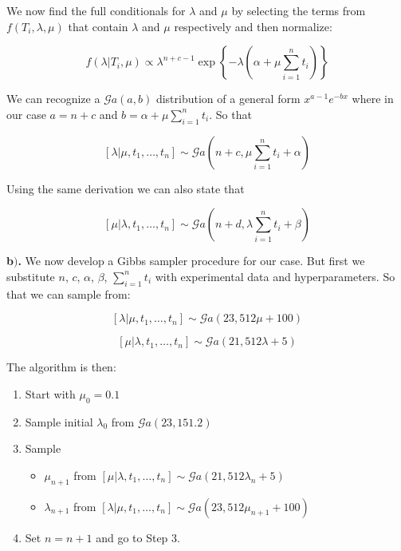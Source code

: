 \documentclass[a4 paper]{article}
\begin{document}
We now find the full conditionals for
$\lambda$ and $\mu$ by selecting the terms 
from $f(T_{i},\lambda,\mu)$ that contain
$\lambda$ and $\mu$ respectively and
then normalize:
 
$$
f(\lambda|T_{i},\mu)	\propto\lambda^{n+c-1}\exp\left\{ -\lambda\left(\alpha+\mu\sum_{i=1}^{n}t_{i}\right)\right\} 
$$

We can recognize a $\mathcal{G}a(a, b)$ 
distribution of a general form $x^{a-1}e^{-b x}$
where in our case $a=n+c$ and 
$b=\alpha+\mu\sum_{i=1}^{n}t_{i}$. So that

$$
\left[\lambda | \mu, t_{1}, \ldots, t_{n}\right] \sim \mathcal{G} a\left(n+c, \mu \sum_{i=1}^{n} t_{i}+\alpha\right)
$$

Using the same derivation we can also state that 

$$
\left[\mu | \lambda, t_{1}, \ldots, t_{n}\right] \sim \mathcal{G} a\left(n+d, \lambda \sum_{i=1}^{n} t_{i}+\beta\right)
$$






\textbf{b$)$.} We now develop a Gibbs sampler 
procedure for our case. But first we
substitute $n$, $c$, $\alpha$, $\beta$, $\sum_{i=1}^{n} t_{i}$ 
with experimental data and hyperparameters. So that 
we can sample from:

$$
\left[\lambda|\mu,t_{1},\ldots,t_{n}\right]\sim\mathcal{G}a\left(23,512\mu+100\right)
$$

$$
\left[\mu|\lambda,t_{1},\ldots,t_{n}\right]\sim\mathcal{G}a\left(21,512\lambda+5\right)
$$

The algorithm is then:

\begin{enumerate}
	\item Start with $\mu_0=0.1$
	
	\item Sample initial $\lambda_0$ from $\mathcal{G}a(23,151.2)$ 

	\item Sample
	\begin{itemize}
		\item $\mu_{n+1}$ from $\left[\mu|\lambda,t_{1},\ldots,t_{n}\right]\sim\mathcal{G}a\left(21,512\lambda_n+5\right)$
		
		\item $\lambda_{n+1}$ from $\left[\lambda|\mu,t_{1},\ldots,t_{n}\right]\sim\mathcal{G}a\left(23,512\mu_{n+1}+100\right)$
	\end{itemize}
	
	
	\item Set $n =n+1$ and go to Step 3.
	
\end{enumerate}
\end{document}
